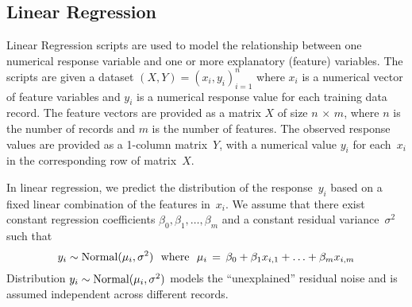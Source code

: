\begin{comment}

 Licensed to the Apache Software Foundation (ASF) under one
 or more contributor license agreements.  See the NOTICE file
 distributed with this work for additional information
 regarding copyright ownership.  The ASF licenses this file
 to you under the Apache License, Version 2.0 (the
 "License"); you may not use this file except in compliance
 with the License.  You may obtain a copy of the License at

   http://www.apache.org/licenses/LICENSE-2.0

 Unless required by applicable law or agreed to in writing,
 software distributed under the License is distributed on an
 "AS IS" BASIS, WITHOUT WARRANTIES OR CONDITIONS OF ANY
 KIND, either express or implied.  See the License for the
 specific language governing permissions and limitations
 under the License.

\end{comment}

\subsection{Linear Regression}
\label{sec:LinReg}

\smallskip

Linear Regression scripts are used to model the relationship between one numerical
response variable and one or more explanatory (feature) variables.
The scripts are given a dataset $(X, Y) = (x_i, y_i)_{i=1}^n$ where $x_i$ is a
numerical vector of feature variables and $y_i$ is a numerical response value for
each training data record.  The feature vectors are provided as a matrix $X$ of size
$n\,{\times}\,m$, where $n$ is the number of records and $m$ is the number of features.
The observed response values are provided as a 1-column matrix~$Y$, with a numerical
value $y_i$ for each~$x_i$ in the corresponding row of matrix~$X$.

In linear regression, we predict the distribution of the response~$y_i$ based on
a fixed linear combination of the features in~$x_i$.  We assume that
there exist constant regression coefficients $\beta_0, \beta_1, \ldots, \beta_m$
and a constant residual variance~$\sigma^2$ such that
\begin{equation}
y_i \sim \mathop{\mathrm{Normal}}\nolimits(\mu_i, \sigma^2) \,\,\,\,\textrm{where}\,\,\,\,
\mu_i \,=\, \beta_0 + \beta_1 x_{i,1} + \ldots + \beta_m x_{i,m}
\label{eqn:linregdef}
\end{equation}
Distribution $y_i \sim \mathop{\mathrm{Normal}}\nolimits(\mu_i, \sigma^2)$ models the ``unexplained'' residual
noise and is assumed independent across different records.

